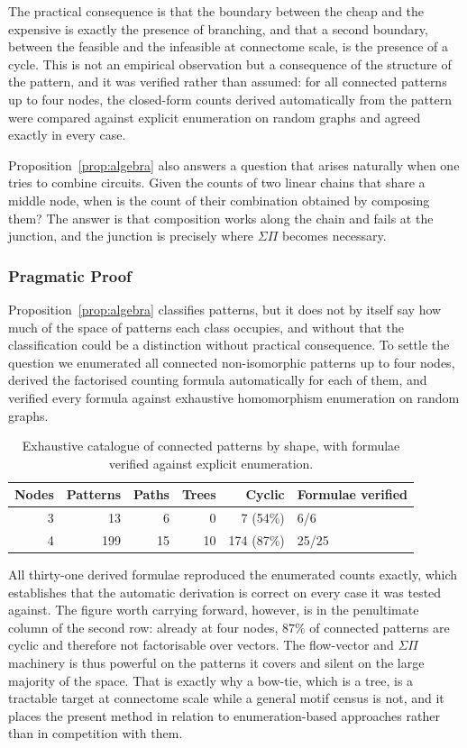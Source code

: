\documentclass[12pt,a4paper,oneside]{article}
\theoremstyle{definition}
\theoremstyle{plain}
\newcommand{\sigmapi}{\ensuremath{\Sigma\Pi}}
\begin{document}
The practical consequence is that the boundary between the cheap and the
expensive is exactly the presence of branching, and that a second boundary,
between the feasible and the infeasible at connectome scale, is the presence
of a cycle. This is not an empirical observation but a consequence of the
structure of the pattern, and it was verified rather than assumed: for all
connected patterns up to four nodes, the closed-form counts derived
automatically from the pattern were compared against explicit enumeration on
random graphs and agreed exactly in every case.

Proposition~\ref{prop:algebra} also answers a question that arises naturally
when one tries to combine circuits. Given the counts of two linear chains
that share a middle node, when is the count of their combination obtained by
composing them? The answer is that composition works along the chain and
fails at the junction, and the junction is precisely where \sigmapi{}
becomes necessary.

\subsubsection{Pragmatic Proof}
\label{sec:algebra-coverage}

Proposition~\ref{prop:algebra} classifies patterns, but it does not by
itself say how much of the space of patterns each class occupies, and
without that the classification could be a distinction without practical
consequence. To settle the question we enumerated all connected
non-isomorphic patterns up to four nodes, derived the factorised counting
formula automatically for each of them, and verified every formula against
exhaustive homomorphism enumeration on random graphs.

\begin{table}[H]
\centering
\caption{Exhaustive catalogue of connected patterns by shape, with formulae
verified against explicit enumeration.}
\label{tab:pattern-catalogue}
\begin{tabular}{rrrrrl}
\toprule
Nodes & Patterns & Paths & Trees & Cyclic & Formulae verified \\
\midrule
3 &  13 &  6 &  0 &   7 (54\%) &  6/6 \\
4 & 199 & 15 & 10 & 174 (87\%) & 25/25 \\
\bottomrule
\end{tabular}
\end{table}

All thirty-one derived formulae reproduced the enumerated counts exactly,
which establishes that the automatic derivation is correct on every case it
was tested against. The figure worth carrying forward, however, is in the
penultimate column of the second row: already at four nodes, $87\%$ of
connected patterns are cyclic and therefore not factorisable over vectors.
The flow-vector and \sigmapi{} machinery is thus powerful on the patterns it
covers and silent on the large majority of the space. That is exactly why a
bow-tie, which is a tree, is a tractable target at connectome scale while a
general motif census is not, and it places the present method in relation to
enumeration-based approaches rather than in competition with them.
\end{document}

